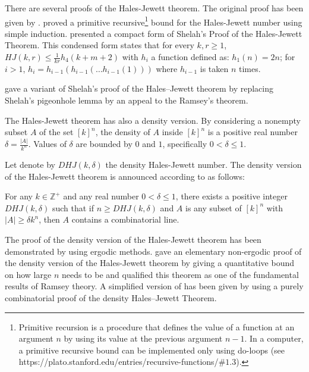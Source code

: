 There are several proofs of the Hales-Jewett theorem. The original proof has been given by \cite{hales1987regularity}. \cite{shelah1988primitive} proved a primitive recursive\footnote{Primitive recursion is a procedure that defines the value of a function at an argument $n$ by using its value at the previous argument $n-1$.  In a computer, a primitive recursive bound can be implemented only using do-loops (see https://plato.stanford.edu/entries/recursive-functions/$\#1.3$).} bound for the Hales-Jewett number using simple induction.
\cite{nilli1990shelah} presented a compact form of Shelah’s Proof of the Hales-Jewett Theorem.  This condensed form states that for every $k,r \geq 1$, $HJ(k,r) \leq \frac{1}{kr} h_4 (k+m+2)$ with $h_i$  a function defined as: $h_1(n)=2n$; for $i>1$, $h_i=h_{i-1}(h_{i-1}(\ldots h_{i-1}(1))) $ where $h_{i-1}$  is taken  $n$ times.

 \cite{matet2007shelah} gave a variant of Shelah’s proof of the Hales–Jewett theorem by replacing Shelah’s pigeonhole lemma by an appeal to the Ramsey’s theorem.

The Hales-Jewett theorem has also a density version. By considering a nonempty subset  $A$ of the set $[k]^n$, the density of $A$ inside $[k]^n$ is a positive real number $\delta=\frac{|A|}{k^n}$. Values of $\delta$ are bounded by $0$ and $1$, specifically  $0< \delta \leq 1.$ 

Let denote by $DHJ(k, \delta)$ the density Hales-Jewett number. The density version of the Hales-Jewett theorem is announced according to \cite{polymath2012new} as follows:

\begin{thm}   For any $k \in \mathbb{Z}^+$ and any real number $0< \delta \leq 1$,  there exists a positive integer $DHJ(k, \delta)$ such that if $n \geq DHJ(k,\delta)$ and $A$ is any subset of $[k] ^n$ with $|A| \geq \delta k^n$, then $A$ contains a combinatorial line.  \label{hj2}	\end{thm}

The proof of the density version of the Hales-Jewett theorem has been demonstrated by \cite{furstenberg1991density} using ergodic methods.  \cite{polymath2012new} gave an elementary non-ergodic proof of the density version of the Hales-Jewett theorem by giving a quantitative bound on how large $n$ needs to be and qualified this theorem as one of the fundamental results of Ramsey theory. A simplified version of \cite{polymath2012new} has been given by \cite{dodos2013simple} using  a purely combinatorial proof of the density Hales–Jewett Theorem.


